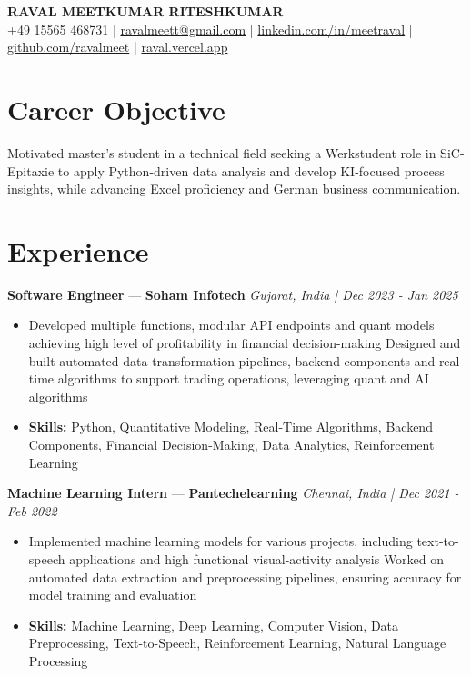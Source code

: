 \documentclass[a4paper,10pt]{article}
\begin{document}
\begin{center}
  {\Large\bfseries RAVAL MEETKUMAR RITESHKUMAR}\\[2pt]
  {\small +49 15565 468731 \;|\; \href{mailto:ravalmeett@gmail.com}{ravalmeett@gmail.com} \;|\; \href{https://www.linkedin.com/in/meetraval/}{linkedin.com/in/meetraval} \;|\; \href{https://github.com/ravalmeet}{github.com/ravalmeet} \;|\; \href{https://raval.vercel.app/}{raval.vercel.app}}
\end{center}
\vspace{-3pt}

\section*{Career Objective}
Motivated master's student in a technical field seeking a Werkstudent role in SiC-Epitaxie to apply Python-driven data analysis and develop KI-focused process insights, while advancing Excel proficiency and German business communication.\par

\section*{Experience}
\textbf{Software Engineer} — \textbf{Soham Infotech} \hfill \textit{Gujarat, India \;|\; Dec 2023 - Jan 2025}\par
\vspace{1pt}
\begin{itemize}
  \item Developed multiple functions, modular API endpoints and quant models achieving high level of profitability in financial decision-making Designed and built automated data transformation pipelines, backend components and real-time algorithms to support trading operations, leveraging quant and AI algorithms
  \item \textbf{Skills:} Python, Quantitative Modeling, Real-Time Algorithms, Backend Components, Financial Decision-Making, Data Analytics, Reinforcement Learning
\end{itemize}
\vspace{3pt}
\textbf{Machine Learning Intern} — \textbf{Pantechelearning} \hfill \textit{Chennai, India \;|\; Dec 2021 - Feb 2022}\par
\vspace{1pt}
\begin{itemize}
  \item Implemented machine learning models for various projects, including text-to-speech applications and high functional visual-activity analysis Worked on automated data extraction and preprocessing pipelines, ensuring accuracy for model training and evaluation
  \item \textbf{Skills:} Machine Learning, Deep Learning, Computer Vision, Data Preprocessing, Text-to-Speech, Reinforcement Learning, Natural Language Processing
\end{itemize}
\end{document}
